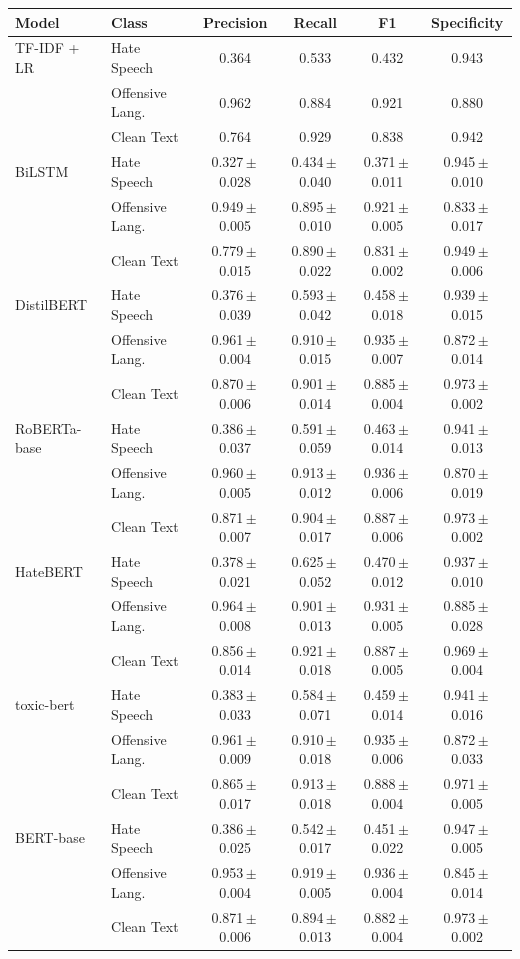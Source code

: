 \begin{tabular}{llcccc}
\toprule
Model & Class & Precision & Recall & F1 & Specificity \\
\midrule
TF-IDF + LR & Hate Speech & 0.364 & 0.533 & 0.432 & 0.943 \\
 & Offensive Lang. & 0.962 & 0.884 & 0.921 & 0.880 \\
 & Clean Text & 0.764 & 0.929 & 0.838 & 0.942 \\
\midrule
BiLSTM & Hate Speech & 0.327\,$\pm$\,0.028 & 0.434\,$\pm$\,0.040 & 0.371\,$\pm$\,0.011 & 0.945\,$\pm$\,0.010 \\
 & Offensive Lang. & 0.949\,$\pm$\,0.005 & 0.895\,$\pm$\,0.010 & 0.921\,$\pm$\,0.005 & 0.833\,$\pm$\,0.017 \\
 & Clean Text & 0.779\,$\pm$\,0.015 & 0.890\,$\pm$\,0.022 & 0.831\,$\pm$\,0.002 & 0.949\,$\pm$\,0.006 \\
\midrule
DistilBERT & Hate Speech & 0.376\,$\pm$\,0.039 & 0.593\,$\pm$\,0.042 & 0.458\,$\pm$\,0.018 & 0.939\,$\pm$\,0.015 \\
 & Offensive Lang. & 0.961\,$\pm$\,0.004 & 0.910\,$\pm$\,0.015 & 0.935\,$\pm$\,0.007 & 0.872\,$\pm$\,0.014 \\
 & Clean Text & 0.870\,$\pm$\,0.006 & 0.901\,$\pm$\,0.014 & 0.885\,$\pm$\,0.004 & 0.973\,$\pm$\,0.002 \\
\midrule
RoBERTa-base & Hate Speech & 0.386\,$\pm$\,0.037 & 0.591\,$\pm$\,0.059 & 0.463\,$\pm$\,0.014 & 0.941\,$\pm$\,0.013 \\
 & Offensive Lang. & 0.960\,$\pm$\,0.005 & 0.913\,$\pm$\,0.012 & 0.936\,$\pm$\,0.006 & 0.870\,$\pm$\,0.019 \\
 & Clean Text & 0.871\,$\pm$\,0.007 & 0.904\,$\pm$\,0.017 & 0.887\,$\pm$\,0.006 & 0.973\,$\pm$\,0.002 \\
\midrule
HateBERT & Hate Speech & 0.378\,$\pm$\,0.021 & 0.625\,$\pm$\,0.052 & 0.470\,$\pm$\,0.012 & 0.937\,$\pm$\,0.010 \\
 & Offensive Lang. & 0.964\,$\pm$\,0.008 & 0.901\,$\pm$\,0.013 & 0.931\,$\pm$\,0.005 & 0.885\,$\pm$\,0.028 \\
 & Clean Text & 0.856\,$\pm$\,0.014 & 0.921\,$\pm$\,0.018 & 0.887\,$\pm$\,0.005 & 0.969\,$\pm$\,0.004 \\
\midrule
toxic-bert & Hate Speech & 0.383\,$\pm$\,0.033 & 0.584\,$\pm$\,0.071 & 0.459\,$\pm$\,0.014 & 0.941\,$\pm$\,0.016 \\
 & Offensive Lang. & 0.961\,$\pm$\,0.009 & 0.910\,$\pm$\,0.018 & 0.935\,$\pm$\,0.006 & 0.872\,$\pm$\,0.033 \\
 & Clean Text & 0.865\,$\pm$\,0.017 & 0.913\,$\pm$\,0.018 & 0.888\,$\pm$\,0.004 & 0.971\,$\pm$\,0.005 \\
\midrule
BERT-base & Hate Speech & 0.386\,$\pm$\,0.025 & 0.542\,$\pm$\,0.017 & 0.451\,$\pm$\,0.022 & 0.947\,$\pm$\,0.005 \\
 & Offensive Lang. & 0.953\,$\pm$\,0.004 & 0.919\,$\pm$\,0.005 & 0.936\,$\pm$\,0.004 & 0.845\,$\pm$\,0.014 \\
 & Clean Text & 0.871\,$\pm$\,0.006 & 0.894\,$\pm$\,0.013 & 0.882\,$\pm$\,0.004 & 0.973\,$\pm$\,0.002 \\
\bottomrule
\end{tabular}
